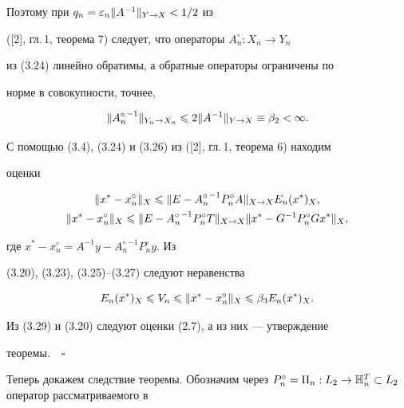 Поэтому при $q_n = \varepsilon_n \|A^{-1}\|_{Y\to X} < 1/2$ из


([2], гл.\,1, теорема 7) следует, что операторы $A_n^\circ:X_n\to Y_n$


из (3.24) линейно обратимы, а обратные операторы ограничены по


норме в совокупности, точнее,


\begin{equation}


\|{A_n^\circ}^{-1}\|_{Y_n\to X_n} \lea 2\|A^{-1}\|_{Y\to X} \equiv


\beta_2 < \infty.


\end{equation}





С помощью (3.4), (3.24) и (3.26) из ([2], гл.\,1, теорема 6) находим


оценки


\begin{gather}


\|x^* - x_n^\circ\|_X \lea \|E - {A_n^\circ}^{-1}P_n^\circ


A\|_{X\to X}E_n(x^*)_X, \\


%


\|x^* - x_n^\circ\|_X \lea \|E - {A_n^\circ}^{-1}P_n^\circ


T\|_{X\to X}\|x^* - G^{-1}P_n^\circ Gx^*\|_X,


\end{gather}


где $x^* - x_n^\circ = A^{-1}y - {A_n^\circ}^{-1}P_n^\circ y$. Из


(3.20), (3.23), (3.25)--(3.27) следуют неравенства


\begin{equation}


E_n(x^*)_X \lea V_n\lea \|x^*- x_n^\circ\|_X \lea \beta_3


E_n(x^*)_X.


\end{equation}


Из (3.29) и (3.20) следуют оценки (2.7), а из них --- утверждение


теоремы.$\quad\square$





Теперь докажем следствие теоремы. Обозначим через $P_n^\circ =


\Pi_n:L_2\to \bH_n^T \subset L_2$ оператор рассматриваемого в


